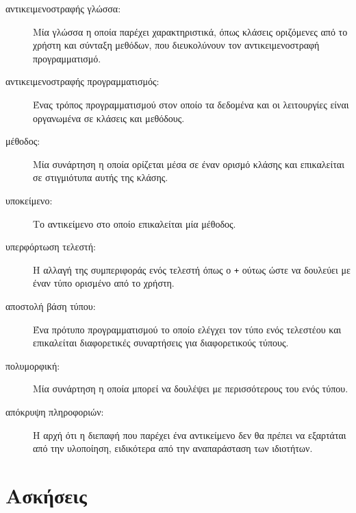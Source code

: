 \documentclass[10pt]{book}
\begin{document}
\begin{description}

\item[αντικειμενοστραφής γλώσσα:] Μία γλώσσα η οποία παρέχει χαρακτηριστικά, 
  όπως κλάσεις οριζόμενες από το χρήστη και σύνταξη μεθόδων, που διευκολύνουν τον 
  αντικειμενοστραφή προγραμματισμό.

\item[αντικειμενοστραφής προγραμματισμός:] Ένας τρόπος προγραμματισμού στον οποίο 
  τα δεδομένα και οι λειτουργίες είναι οργανωμένα σε κλάσεις και μεθόδους.

\item[μέθοδος:] Μία συνάρτηση η οποία ορίζεται μέσα σε έναν ορισμό κλάσης και επικαλείται 
  σε στιγμιότυπα αυτής της κλάσης.

\item[υποκείμενο:] Το αντικείμενο στο οποίο επικαλείται μία μέθοδος.

\item[υπερφόρτωση τελεστή:] Η αλλαγή της συμπεριφοράς ενός τελεστή όπως ο {\tt +}
   ούτως ώστε να δουλεύει με έναν τύπο ορισμένο από το χρήστη.

\item[αποστολή βάση τύπου:] Ένα πρότυπο προγραμματισμού το οποίο ελέγχει τον τύπο ενός 
  τελεστέου και επικαλείται διαφορετικές συναρτήσεις για διαφορετικούς τύπους.

\item[πολυμορφική:] Μία συνάρτηση η οποία μπορεί να δουλέψει με περισσότερους του ενός 
  τύπου.

\item[απόκρυψη πληροφοριών:] Η αρχή ότι η διεπαφή που παρέχει ένα αντικείμενο δεν θα 
  πρέπει να εξαρτάται από την υλοποίηση, ειδικότερα από την αναπαράσταση των ιδιοτήτων.


\end{description}

\section{Ασκήσεις}
\end{document}
